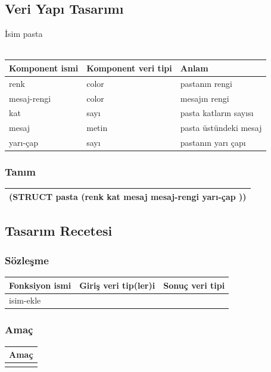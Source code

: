 \documentclass[12pt, a4paper]{article}
\newcommand\fillin[1][3cm]{\makebox[#1]{\dotfill}}
\begin{document}
\newpage

\subsection*{Veri Yapı Tasarımı}
İsim \fillin[5cm]pasta\\
\vspace{0.5cm}\\
\begin{tabular}{| p{4cm} | p{4cm} | p{8cm} |  }
\hline			
Komponent ismi&Komponent veri tipi&Anlam\\
\hline
renk&color &pastanın rengi \\[10ex]
\hline  
mesaj-rengi&color &mesajın rengi \\[10ex]
\hline  
kat&sayı &pasta katların sayısı \\[10ex]
\hline  
mesaj&metin &pasta üstündeki mesaj \\[10ex]
\hline  
yarı-çap&sayı &pastanın yarı çapı \\[10ex]
\hline  
\end{tabular}

\subsubsection*{Tanım}
\begin{tabular}{| p{17cm} |  }
\hline			
\vspace{0.5cm}
(STRUCT \fillin[3cm]pasta (\fillin[1cm]renk kat mesaj mesaj-rengi yarı-çap ))\\[10ex]
\hline
\end{tabular}





\newpage
\subsection*{Tasarım Recetesi}
\subsubsection*{Sözleşme}
\begin{tabular}{| p{4cm} | p{8cm} | p{4cm} |  }
\hline			
Fonksiyon ismi&Giriş veri tip(ler)i&Sonuç veri tipi\\
\hline
isim-ekle& & \\[10ex]
\hline  
\end{tabular}

\subsubsection*{Amaç}
\begin{tabular}{| p{17cm} |  }
\hline			
Amaç\\
\hline
 \\[10ex]
\hline  
\end{tabular}
\end{document}
